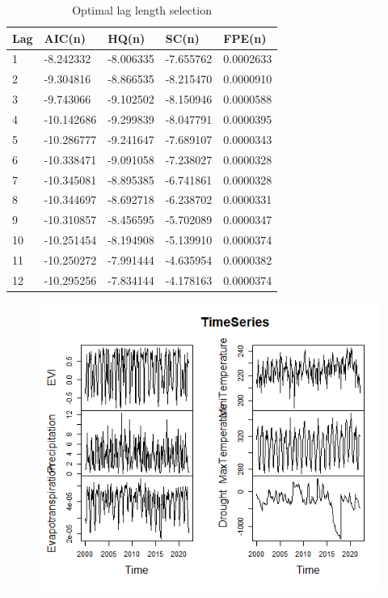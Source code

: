 \begin{table}[]
	\label{Optimal lag}
	\caption{Optimal lag length selection}
	\centering
	\addtolength{\tabcolsep}{25pt}
	\begin{tabularx}{\textwidth}{@{}lllll@{}}
		\toprule
	 Lag  &	AIC(n)&	HQ(n)&	SC(n)&	FPE(n)\\\midrule
	1&	-8.242332&	-8.006335&	-7.655762&	0.0002633\\
	2&	-9.304816&	-8.866535&	-8.215470&	0.0000910\\
	3&	-9.743066&	-9.102502&	-8.150946&	0.0000588\\
	4&	-10.142686&	-9.299839&	-8.047791&	0.0000395\\
	5&	-10.286777&	-9.241647&	-7.689107&	0.0000343\\
	6&	-10.338471&	-9.091058&	-7.238027&	0.0000328\\
	7&	-10.345081&	-8.895385&	-6.741861&	0.0000328\\
	8&	-10.344697&	-8.692718&	-6.238702&	0.0000331\\
	9&	-10.310857&	-8.456595&	-5.702089&	0.0000347\\
	10&	-10.251454&	-8.194908&	-5.139910&	0.0000374\\
	11&	-10.250272&	-7.991444&	-4.635954&	0.0000382\\
	12&	-10.295256&	-7.834144&	-4.178163&	0.0000374\\
		 \bottomrule
	\end{tabularx}
\end{table}
\begin{figure}
	\centering
	\includegraphics[width=0.7\linewidth]{images/Rplot20}
	\caption{}
	\label{fig:rplot20}
\end{figure}

